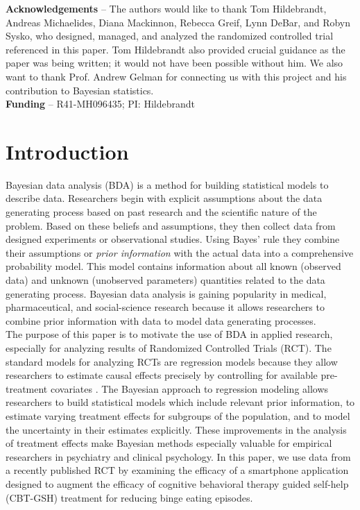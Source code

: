 \documentclass{article}
\begin{document}
\textbf{Acknowledgements} -- The authors would like to thank Tom Hildebrandt,  Andreas Michaelides, Diana Mackinnon, Rebecca Greif, Lynn DeBar, and Robyn Sysko, who designed, managed, and analyzed the randomized controlled trial referenced in this paper.  Tom Hildebrandt also provided crucial guidance as the paper was being written; it would not have been possible without him. We also want to thank Prof. Andrew Gelman for connecting us with this project and his contribution to Bayesian statistics. \\
\textbf{Funding} -- R41-MH096435; PI: Hildebrandt


\newpage

\section{Introduction}
Bayesian data analysis (BDA) is a method for building statistical models to describe data.  Researchers begin with explicit assumptions about the data generating process based on past research and the scientific nature of the problem. Based on these beliefs and assumptions, they then collect data from designed experiments or observational studies. Using Bayes' rule they combine their assumptions or \textit{prior information} with the actual data into a comprehensive probability model. This model contains information about all known (observed data) and unknown (unobserved parameters) quantities related to the data generating process. Bayesian data analysis is gaining popularity in medical, pharmaceutical, and social-science research because it allows researchers to combine prior information with data to model data generating processes.\\
The purpose of this paper is to motivate the use of BDA in applied research, especially for analyzing results of Randomized Controlled Trials (RCT). The standard models for analyzing RCTs are regression models because they allow researchers to estimate causal effects precisely by controlling for available pre-treatment covariates \cite{gelman2006data}. The Bayesian approach to regression modeling allows researchers to build statistical models which include relevant prior information, to estimate varying treatment effects for subgroups of the population, and to model the uncertainty in their estimates explicitly.  These improvements in the analysis of treatment effects make Bayesian methods especially valuable for empirical researchers in psychiatry and clinical psychology.   In this paper, we use data from a recently published RCT by  examining the efficacy of a smartphone application designed to augment the efficacy of cognitive behavioral therapy guided self-help (CBT-GSH) treatment for reducing binge eating episodes. \\
\end{document}

